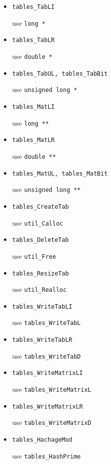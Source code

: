 \begin{itemize}

\item {\tt  tables\_TabLI}

use {\tt long *}

\item {\tt  tables\_TabLR}

use {\tt double *}

\item {\tt  tables\_TabUL, tables\_TabBit}

use {\tt unsigned long *}


\item {\tt  tables\_MatLI}

use {\tt long **}

\item {\tt  tables\_MatLR}

use {\tt double **}

\item {\tt  tables\_MatUL, tables\_MatBit}

use {\tt unsigned long **}

\item {\tt  tables\_CreateTab}

use {\tt util\_Calloc}

\item {\tt  tables\_DeleteTab}

use {\tt util\_Free}

\item {\tt  tables\_ResizeTab}

use {\tt util\_Realloc}

\item {\tt  tables\_WriteTabLI}

use {\tt tables\_WriteTabL}

\item {\tt tables\_WriteTabLR }

use {\tt  tables\_WriteTabD}

\item {\tt  tables\_WriteMatrixLI}

use {\tt  tables\_WriteMatrixL}

\item {\tt  tables\_WriteMatrixLR}

use {\tt  tables\_WriteMatrixD}

\item {\tt  tables\_HachageMod}

use {\tt tables\_HashPrime}

\end{itemize}


